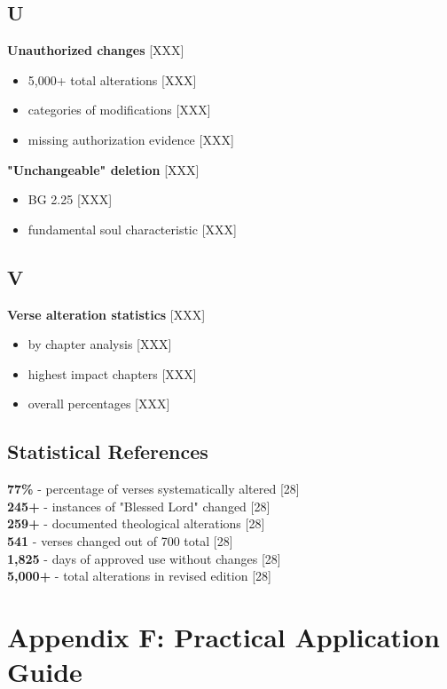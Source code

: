 \documentclass[11pt,twoside]{book}
\begin{document}
\section*{U}
\label{sec:org2ca1db2}

\textbf{\textbf{Unauthorized changes}} {[}XXX]
\begin{itemize}
\item 5,000+ total alterations [XXX]
\item categories of modifications [XXX]
\item missing authorization evidence [XXX]
\end{itemize}

\textbf{\textbf{"Unchangeable" deletion}} {[}XXX]
\begin{itemize}
\item BG 2.25 [XXX]
\item fundamental soul characteristic [XXX]
\end{itemize}
\section*{V}
\label{sec:org7ee2792}

\textbf{\textbf{Verse alteration statistics}} {[}XXX]
\begin{itemize}
\item by chapter analysis [XXX]
\item highest impact chapters [XXX]
\item overall percentages [XXX]
\end{itemize}
\section*{Statistical References}
\label{sec:org546fefc}

\textbf{\textbf{77\%}} - percentage of verses systematically altered [28]\\
\textbf{\textbf{245+}} - instances of "Blessed Lord" changed [28]\\
\textbf{\textbf{259+}} - documented theological alterations [28]\\
\textbf{\textbf{541}} - verses changed out of 700 total [28]\\
\textbf{\textbf{1,825}} - days of approved use without changes [28]\\
\textbf{\textbf{5,000+}} - total alterations in revised edition [28]
\chapter*{Appendix F: Practical Application Guide}
\label{sec:orgappendixf}
\end{document}
